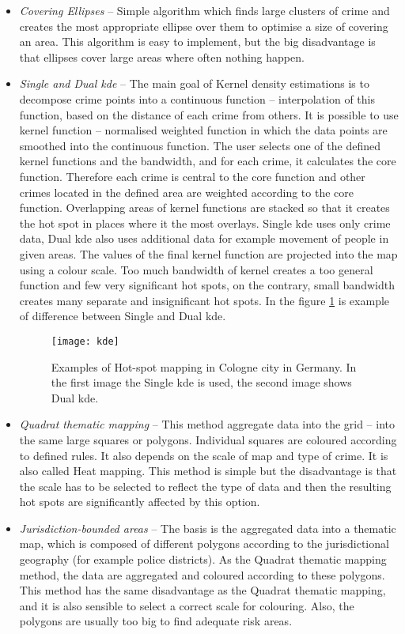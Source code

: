\documentclass[thesis=M,english]{FITthesis}[2012/10/20]
\begin{document}
\begin{itemize}
\item \textit{Covering Ellipses} -- Simple algorithm which finds large clusters of crime and creates the most appropriate ellipse over them to optimise a size of covering an area. This algorithm is easy to implement, but the big disadvantage is that ellipses cover large areas where often nothing happen.

\item \textit{Single and Dual \gls{kde}} --  The main goal of Kernel density estimations is to decompose crime points into a continuous function -- interpolation of this function, based on the distance of each crime from others. It is possible to use kernel function -- normalised weighted function in which the data points are smoothed into the continuous function. The user selects one of the defined kernel functions and the bandwidth, and for each crime, it calculates the core function. Therefore each crime is central to the core function and other crimes located in the defined area are weighted according to the core function. Overlapping areas of kernel functions are stacked so that it creates the hot spot in places where it the most overlays. Single \gls{kde} uses only crime data, Dual \gls{kde} also uses additional data for example movement of people in given areas. The values of the final kernel function are projected into the map using a colour scale. Too much bandwidth of kernel creates a too general function and few very significant hot spots, on the contrary, small bandwidth creates many separate and insignificant hot spots. In the figure \ref{fig:hotspot} is example of difference between Single and Dual \gls{kde}.

\begin{figure}[ht]\centering
    \texttt{[image: kde]}
    \caption{Examples of Hot-spot mapping in Cologne city in Germany. In the first image the Single \gls{kde} is used, the second image shows Dual \gls{kde}.\cite[25]{PP13}}\label{fig:hotspot}
\end{figure}

\item \textit{Quadrat thematic mapping} -- This method aggregate data into the grid -- into the same large squares or polygons. Individual squares are coloured according to defined rules. It also depends on the scale of map and type of crime. It is also called Heat mapping. This method is simple but the disadvantage is that the scale has to be selected to reflect the type of data and then the resulting hot spots are significantly affected by this option. 

\item \textit{Jurisdiction-bounded areas} -- The basis is the aggregated data into a thematic map, which is composed of different polygons according to the jurisdictional geography (for example police districts). As the Quadrat thematic mapping method, the data are aggregated and coloured according to these polygons. This method has the same disadvantage as the Quadrat thematic mapping, and it is also sensible to select a correct scale for colouring. Also, the polygons are usually too big to find adequate risk areas. 
\end{itemize}
\end{document}
